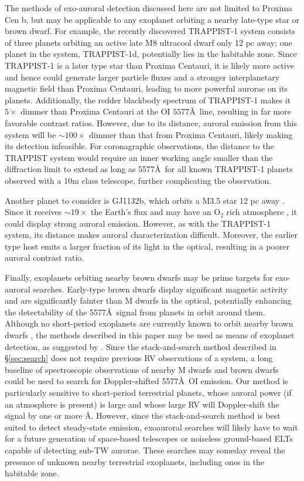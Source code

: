 \documentclass{emulateapj}
\newcommand{\XXX}[1]{#1}      %
\begin{document}
The methods of exo-auroral detection discussed here are not limited to Proxima Cen b, but may be applicable to any exoplanet orbiting a nearby late-type star or brown dwarf.  For example, the recently discovered TRAPPIST-1 system \citep{Gillon2016} consists of three planets orbiting an active late M8 ultracool dwarf only 12 pc away; one planet in the system, TRAPPIST-1d, potentially lies in the habitable zone. Since TRAPPIST-1 is a later type star than Proxima Centauri, it is likely more active \citep[e.g.,][]{West2008} and hence could generate larger particle fluxes and a stronger interplanetary magnetic field than Proxima Centauri, leading to more powerful aurorae on its planets. Additionally, \XXX{the redder blackbody spectrum of TRAPPIST-1} makes it $5\times$ dimmer than Proxima Centauri at the OI $5577$\AA\ line, resulting in far more favorable contrast ratios. However, due to its distance, auroral emission from this system will be ${\sim} 100\times$ dimmer than that from Proxima Centauri, likely making its detection infeasible. For coronagraphic observations, the distance to the TRAPPIST system would require an inner working angle smaller than the diffraction limit to extend as long as 5577\AA\ for all known TRAPPIST-1 planets observed with a 10m class telescope, further complicating the observation.

Another planet to consider is GJ1132b, which orbits a M3.5 star 12 pc away \citep{Berta2015}. Since it receives ${\sim} 19\times$ the Earth's flux and may have an O$_2$ rich atmosphere \citep{Schaefer2016}, it could display strong auroral emission. However, as with the TRAPPIST-1 system, its distance makes auroral characterization difficult. Moreover, the earlier type host emits a larger fraction of its light in the optical, resulting in a poorer auroral contrast ratio.

Finally, exoplanets orbiting nearby brown dwarfs may be prime targets for exo-auroral searches. Early-type brown dwarfs display significant magnetic activity \citep{West2008} and are significantly fainter than M dwarfs in the optical, potentially enhancing the detectability of the 5577\AA\ signal from planets in orbit around them. Although no short-period exoplanets are currently known to orbit nearby brown dwarfs \citep{He2016}, the methods described in this paper may be used as means of exoplanet detection, as suggested by \citet{SparksFord2002}. Since the stack-and-search method described in \S\ref{sec:search} does not require previous RV observations of a system, a long baseline of spectroscopic observations of nearby M dwarfs and brown dwarfs could be used to search for Doppler-shifted 5577\AA\ OI emission. Our method is particularly sensitive to short-period terrestrial planets, whose auroral power (if an atmosphere is present) is large and whose large RV will Doppler-shift the signal by one or more \AA. \XXX{However, since the stack-and-search method is best suited to detect steady-state emission, exoauroral searches will likely have to wait for a future generation of space-based telescopes or noiseless ground-based ELTs capable of detecting sub-TW aurorae. These searches may someday} reveal the presence of unknown nearby terrestrial exoplanets, including ones in the habitable zone.
\end{document}
